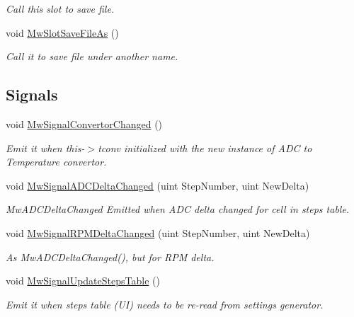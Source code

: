 \begin{DoxyCompactItemize}
\begin{DoxyCompactList}\small\item\em Call this slot to save file. \end{DoxyCompactList}\item 
\mbox{\label{class_main_window_aaadd1a2cd4aec05d23e934a26ee3dbc6}} 
void \hyperlink{class_main_window_aaadd1a2cd4aec05d23e934a26ee3dbc6}{Mw\+Slot\+Save\+File\+As} ()
\begin{DoxyCompactList}\small\item\em Call it to save file under another name. \end{DoxyCompactList}\end{DoxyCompactItemize}
\subsection*{Signals}
\begin{DoxyCompactItemize}
\item 
\mbox{\label{class_main_window_abc97afb888a70565123689a1444ab4b9}} 
void \hyperlink{class_main_window_abc97afb888a70565123689a1444ab4b9}{Mw\+Signal\+Convertor\+Changed} ()
\begin{DoxyCompactList}\small\item\em Emit it when this-\/$>$tconv initialized with the new instance of A\+DC to Temperature convertor. \end{DoxyCompactList}\item 
void \hyperlink{class_main_window_a37ea64ccb9b5bcf9bb976602d42aadfa}{Mw\+Signal\+A\+D\+C\+Delta\+Changed} (uint Step\+Number, uint New\+Delta)
\begin{DoxyCompactList}\small\item\em Mw\+A\+D\+C\+Delta\+Changed Emitted when A\+DC delta changed for cell in steps table. \end{DoxyCompactList}\item 
void \hyperlink{class_main_window_a7b5fab96f0c2363958436141a3aae65b}{Mw\+Signal\+R\+P\+M\+Delta\+Changed} (uint Step\+Number, uint New\+Delta)
\begin{DoxyCompactList}\small\item\em As Mw\+A\+D\+C\+Delta\+Changed(), but for R\+PM delta. \end{DoxyCompactList}\item 
\mbox{\label{class_main_window_abf2e8820a7173fb2231e7f835160d8a1}} 
void \hyperlink{class_main_window_abf2e8820a7173fb2231e7f835160d8a1}{Mw\+Signal\+Update\+Steps\+Table} ()
\begin{DoxyCompactList}\small\item\em Emit it when steps table (UI) needs to be re-\/read from settings generator. \end{DoxyCompactList}\end{DoxyCompactItemize}

